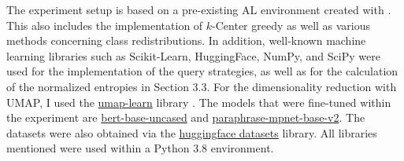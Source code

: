 \documentclass[english,bachelor,ul]{webisthesis} %
\begin{document}
The experiment setup is based on a pre-existing AL environment created with \cite{schroeder2023small-text}. This also includes the implementation of $k$-Center greedy as well as various methods concerning class redistributions. In addition, well-known machine learning libraries such as Scikit-Learn, HuggingFace, NumPy, and SciPy were used for the implementation of the query strategies, as well as for the calculation of the normalized entropies in Section 3.3. For the dimensionality reduction with UMAP, I used the \href{https://github.com/lmcinnes/umap}{umap-learn} library \citep{DBLP:journals/corr/abs-1802-03426}. The models that were fine-tuned within the experiment are \href{https://huggingface.co/google-bert/bert-base-uncased}{bert-base-uncased} and \href{https://huggingface.co/sentence-transformers/paraphrase-mpnet-base-v2}{
paraphrase-mpnet-base-v2}. The datasets were also obtained via the \href{https://github.com/huggingface/datasets}{huggingface datasets} library. All libraries mentioned were used within a Python 3.8 environment.

\end{document}
